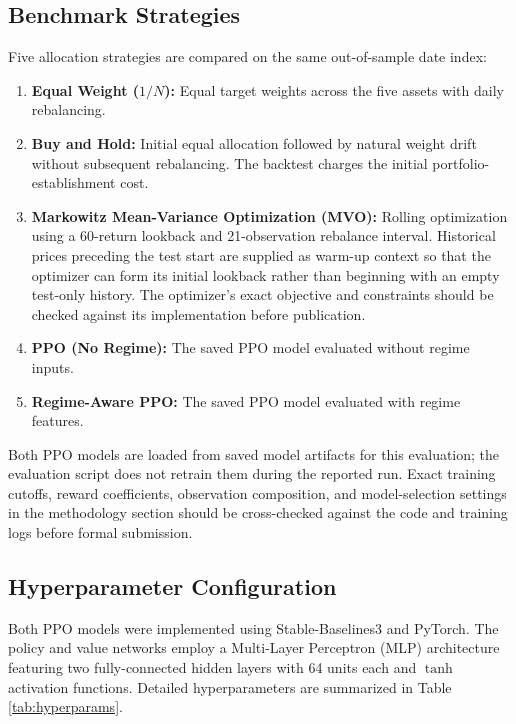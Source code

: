 \documentclass[conference]{IEEEtran}
\begin{document}
\subsection{Benchmark Strategies} Five allocation strategies are compared on the same out-of-sample date index:
\begin{enumerate}
    \item \textbf{Equal Weight ($1/N$):} Equal target weights across the five assets with daily rebalancing.
    \item \textbf{Buy and Hold:} Initial equal allocation followed by natural weight drift without subsequent rebalancing. The backtest charges the initial portfolio-establishment cost.
    \item \textbf{Markowitz Mean-Variance Optimization (MVO):} Rolling optimization using a 60-return lookback and 21-observation rebalance interval. Historical prices preceding the test start are supplied as warm-up context so that the optimizer can form its initial lookback rather than beginning with an empty test-only history. The optimizer's exact objective and constraints should be checked against its implementation before publication.
    \item \textbf{PPO (No Regime):} The saved PPO model evaluated without regime inputs.
    \item \textbf{Regime-Aware PPO:} The saved PPO model evaluated with regime features.
\end{enumerate}
Both PPO models are loaded from saved model artifacts for this evaluation; the evaluation script does not retrain them during the reported run. Exact training cutoffs, reward coefficients, observation composition, and model-selection settings in the methodology section should be cross-checked against the code and training logs before formal submission.

\subsection{Hyperparameter Configuration}
Both PPO models were implemented using Stable-Baselines3 and PyTorch. The policy and value networks employ a Multi-Layer Perceptron (MLP) architecture featuring two fully-connected hidden layers with 64 units each and $\tanh$ activation functions. Detailed hyperparameters are summarized in Table \ref{tab:hyperparams}.
\end{document}
